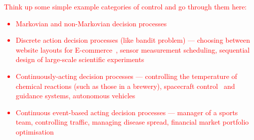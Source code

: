\textcolor{red}{
Think up some simple example categories of control and go through them here:
\begin{itemize}
\item{Markovian and non-Markovian decision processes}
\item{Discrete action decision processes (like bandit problem) --- choosing between website layouts for E-commerce~\cite{liu2021map}, sensor measurement scheduling, sequential design of large-scale scientific experiments }
\item{Continuously-acting decision processes --- controlling the temperature of chemical reactions (such as those in a brewery), spacecraft control~\cite{tipaldi2022reinforcement} and guidance systems, autonomous vehicles }
\item{Continuous event-based acting decision processes --- manager of a sports team, controlling traffic, managing disease spread, financial market portfolio optimisation }
\end{itemize}
}